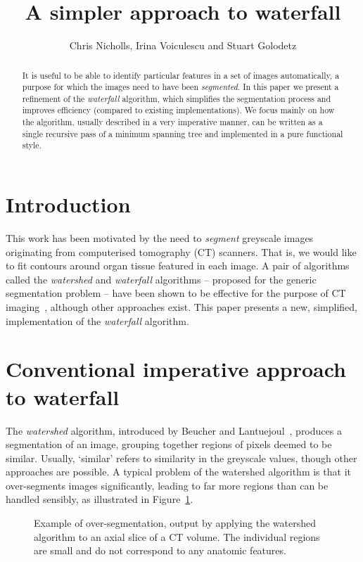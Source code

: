 \documentclass{jfp}
\title{\LARGE \bf
A simpler approach to waterfall
}
\author{Chris Nicholls, Irina Voiculescu and Stuart Golodetz
}
\begin{document}
\maketitle

\begin{abstract}
It is useful to be able to identify particular features in a set of
images automatically, a purpose for which the images need to have been
{\em segmented}. In this paper we present a refinement of the {\em
  waterfall\/} algorithm, which simplifies the segmentation process
and improves efficiency (compared to existing implementations).  We
focus mainly on how the algorithm, usually described in a very
imperative manner, can be written as a single recursive pass of a
minimum spanning tree and implemented in a pure functional style.


\end{abstract}

\section{Introduction}

This work has been motivated by the need to {\em segment\/} greyscale
images originating from computerised tomography (CT) scanners. That
is, we would like to fit contours around organ tissue featured in each
image. A pair of algorithms called the {\em watershed\/} and {\em
waterfall\/} algorithms -- proposed for the generic segmentation
  problem -- have been shown to be effective for the purpose of CT
  imaging~\cite{golodetz}, although other approaches exist. This paper
  presents a new, simplified, implementation of the {\em waterfall\/}
  algorithm.

\section{Conventional imperative approach to waterfall}

The {\em watershed\/} algorithm, introduced by Beucher and
Lantuejoul~\cite{beucher79}, produces a segmentation of an image,
grouping together regions of pixels deemed to be similar. Usually,
`similar' refers to similarity in the greyscale values, though other
approaches are possible. A typical problem of the watershed algorithm
is that it over-segments images significantly, leading to far more
regions than can be handled sensibly, as illustrated in
Figure~\ref{fig:oversegmented}.

\begin{figure}
\centering
\ifpdf
        \hspace{1mm}%
\else
\fi
\caption{Example of over-segmentation, output by applying the watershed
  algorithm to an axial slice of a CT volume. The individual regions
  are small and do not correspond to any anatomic features.}
\label{fig:oversegmented}
\end{figure}
%
\end{document}
